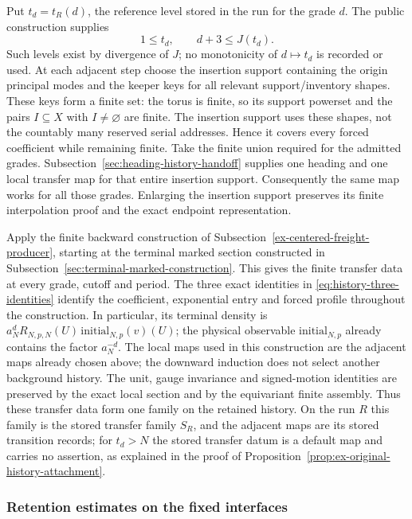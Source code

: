 Put $t_d=t_R(d)$, the reference level stored in the run for the grade
$d$. The public construction supplies
\[
                 1\le t_d,\qquad d+3\le J(t_d).
\]
Such levels exist by divergence of $J$; no monotonicity of
$d\mapsto t_d$ is recorded or used. At each adjacent step
choose the insertion support containing the origin principal modes and the keeper
keys for all relevant support/inventory shapes. These keys form a finite
set: the torus is finite, so its support powerset and the pairs
$I\subseteq X$ with $I\ne\varnothing$ are finite. The insertion support uses
these shapes, not the countably many reserved serial addresses. Hence
it covers every forced coefficient while remaining finite. Take the
finite union required for the admitted grades.
Subsection~\ref{sec:heading-history-handoff} supplies one heading and
one local transfer map for that entire insertion support. Consequently the same
map works for all those grades. Enlarging the insertion support preserves its
finite interpolation proof and the exact endpoint representation.

Apply the finite backward construction of
Subsection~\ref{ex-centered-freight-producer}, starting at the terminal
marked section constructed in Subsection~\ref{sec:terminal-marked-construction}. This gives the finite transfer data at every grade,
cutoff and period. The three exact identities in
\eqref{eq:history-three-identities} identify the coefficient,
exponential entry and forced profile throughout the construction.
In particular, its terminal density is
$a_N^d R_{N,p,N}(U)\,\mathrm{initial}_{N,p}(v)(U)$;
the physical observable $\mathrm{initial}_{N,p}$ already contains
the factor $a_N^{-d}$. The local maps used
in this construction are the adjacent maps already chosen above;
the downward induction does not select another background history.
The unit, gauge invariance and signed-motion identities are preserved
by the exact local section and by the equivariant finite assembly.
Thus these transfer data form one family on the retained history. On the
run $R$ this family is the stored transfer family $S_R$, and the adjacent
maps are its stored transition records; for $t_d>N$ the stored transfer
datum is a default map and carries no assertion, as explained in the
proof of Proposition~\ref{prop:ex-original-history-attachment}.

\subsubsection{Retention estimates on the fixed interfaces}

